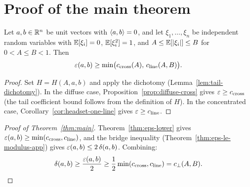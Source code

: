 \section{Proof of the main theorem}\label{sec:main}

\begin{theorem}\label{thm:eps-lower}
Let $a, b \in \mathbb{R}^n$ be unit vectors with $\langle a,b\rangle = 0$, and let
$\xi_1, \dots, \xi_n$ be independent random variables with
$\mathbb{E}[\xi_i] = 0$, $\mathbb{E}[\xi_i^2] = 1$, and
$A \le \mathbb{E}[\lvert \xi_i \rvert] \le B$ for $0 < A \le B < 1$. Then
\[
\varepsilon(a,b)
\ge \min\bigl(c_{\mathrm{cross}}(A),\,
c_{\mathrm{line}}(A,B)\bigr).
\]
\end{theorem}

\begin{proof}
Set $H = H(A,a,b)$ and apply the dichotomy
(Lemma~\ref{lem:tail-dichotomy}).
In the diffuse case,
Proposition~\ref{prop:diffuse-cross} gives
$\varepsilon \ge c_{\mathrm{cross}}$ (the tail coefficient bound follows from
the definition of $H$).
In the concentrated case, Corollary~\ref{cor:headset-one-line} gives
$\varepsilon \ge c_{\mathrm{line}}$.
\end{proof}

\begin{proof}[Proof of Theorem~\ref{thm:main}]
Theorem~\ref{thm:eps-lower} gives
$\varepsilon(a,b) \ge \min(c_{\mathrm{cross}}, c_{\mathrm{line}})$,
and the bridge inequality
(Theorem~\ref{thm:eps-le-modulus-app}) gives
$\varepsilon(a,b) \le 2\,\delta(a,b)$.
Combining:
\[
\delta(a,b) \ge \frac{\varepsilon(a,b)}{2}
\ge \frac{1}{2}
\min(c_{\mathrm{cross}}, c_{\mathrm{line}})
= c_\perp(A,B). \qedhere
\]
\end{proof}
